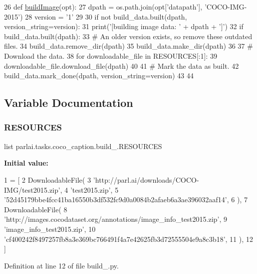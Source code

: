 \begin{DoxyCode}
26 \textcolor{keyword}{def }\hyperlink{namespaceparlai_1_1tasks_1_1coco__caption_1_1build__2015_a52edd896124184ec02d76b23368557aa}{buildImage}(opt):
27     dpath = os.path.join(opt[\textcolor{stringliteral}{'datapath'}], \textcolor{stringliteral}{'COCO-IMG-2015'})
28     version = \textcolor{stringliteral}{'1'}
29 
30     \textcolor{keywordflow}{if} \textcolor{keywordflow}{not} build\_data.built(dpath, version\_string=version):
31         print(\textcolor{stringliteral}{'[building image data: '} + dpath + \textcolor{stringliteral}{']'})
32         \textcolor{keywordflow}{if} build\_data.built(dpath):
33             \textcolor{comment}{# An older version exists, so remove these outdated files.}
34             build\_data.remove\_dir(dpath)
35         build\_data.make\_dir(dpath)
36 
37         \textcolor{comment}{# Download the data.}
38         \textcolor{keywordflow}{for} downloadable\_file \textcolor{keywordflow}{in} RESOURCES[:1]:
39             downloadable\_file.download\_file(dpath)
40 
41         \textcolor{comment}{# Mark the data as built.}
42         build\_data.mark\_done(dpath, version\_string=version)
43 
44 
\end{DoxyCode}


\subsection{Variable Documentation}
\mbox{\label{namespaceparlai_1_1tasks_1_1coco__caption_1_1build__2015_ab0466bad8206a86ea4c5210536113ec2}} 
\subsubsection{\texorpdfstring{R\+E\+S\+O\+U\+R\+C\+ES}{RESOURCES}}
{\footnotesize\ttfamily list parlai.\+tasks.\+coco\+\_\+caption.\+build\+\_.\+R\+E\+S\+O\+U\+R\+C\+ES}

{\bfseries Initial value\+:}
\begin{DoxyCode}
1 =  [
2     DownloadableFile(
3         \textcolor{stringliteral}{'http://parl.ai/downloads/COCO-IMG/test2015.zip'},
4         \textcolor{stringliteral}{'test2015.zip'},
5         \textcolor{stringliteral}{'52d45179bbe4fcc41ba16550b3df532fc9d0a0084b2afaeb6a3ae396032aaf14'},
6     ),
7     DownloadableFile(
8         \textcolor{stringliteral}{'http://images.cocodataset.org/annotations/image\_info\_test2015.zip'},
9         \textcolor{stringliteral}{'image\_info\_test2015.zip'},
10         \textcolor{stringliteral}{'cf400242f8497257fb8a3e369bc766491f4a7e42625fb3d72555504e9a8c3b18'},
11     ),
12 ]
\end{DoxyCode}


Definition at line 12 of file build\+\_.\+py.

